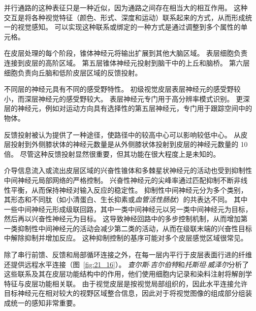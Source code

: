 并行通路的这种表征只是一种近似，因为通路之间存在相当大的相互作用。
这种交互是将各种视觉特征（颜色、形式、深度和运动）联系起来的方式，从而形成统一的视觉感知。
可以实现这种联系或绑定的一种方式是通过调整到多个属性的单元格。


在皮层处理的每个阶段，锥体神经元将输出扩展到其他大脑区域。
表层细胞负责连接到皮层的高阶区域。
第五层锥体神经元投射到脑干中的上丘和脑桥。
第六层细胞负责向丘脑和低阶皮层区域的反馈投射。


不同层的神经元具有不同的感受野特性。
初级视觉皮层表层神经元的感受野较小，而深层神经元的感受野较大。
表层神经元专门用于高分辨率模式识别。 
更深层的神经元，例如对运动方向具有选择性的第五层神经元，专门用于跟踪空间中的物体。


反馈投射被认为提供了一种途径，使路径中的较高中心可以影响较低中心。
从皮层投射到外侧膝状体的神经元数量是从外侧膝状体投射到皮层的神经元数量的 10 倍。
尽管这种反馈投射显然很重要，但其功能在很大程度上是未知的。


介导信息流入或流出皮层区域的兴奋性锥体和多棘星状神经元的活动也受到抑制性中间神经元局部网络的严格控制。
兴奋性神经元的尖峰率通过匹配抑制不断非线性平衡，从而保持神经对输入反应的稳定性。
抑制性中间神经元分为多个类别，其形态和不同肽（如小清蛋白、生长抑素或\textit{血管活性肠肽}）的共表达不同。
其中一些中间神经元形成级联回路，其中一类中间神经元以另一类中间神经元为目标，然后再以兴奋性神经元为目标。
这导致神经回路中的多步控制机制，从而增加第一类抑制性中间神经元的活动会减少第二类的活动，从而在级联末端的兴奋性目标中解除抑制并增加反应。
这种抑制控制的基序可能对多个皮层感觉区域很常见。


除了串行前馈、反馈和局部循环连接之外，在每一层内平行于皮层表面行进的纤维还提供远程水平连接（图~\ref{fig:21_16}）。
\textit{查尔斯$\cdot$吉尔伯特}和\textit{托斯坦$\cdot$威泽尔}分析了这些联系及其在皮层功能结构中的作用，他们使用细胞内记录和染料注射将解剖学特征与皮层功能相关联。
由于视觉皮层是按视觉局部组织的，因此水平连接允许目标神经元在相对较大的视野区域整合信息，因此对于将视觉图像的组成部分组装成统一的感知非常重要。


